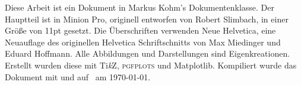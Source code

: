 {{{{    \vspace*{6pt}
        Diese Arbeit ist ein  Dokument in Markus Kohm's  Dokumentenklasse.
        Der Hauptteil ist in Minion Pro, originell entworfen von Robert Slimbach, in einer Größe von 11pt gesetzt.
        Die Überschriften verwenden Neue Helvetica, eine Neuauflage des originellen Helvetica Schriftschnitts von Max Miedinger und Eduard Hoffmann.
        Alle Abbildungen und Darstellungen sind Eigenkreationen.
        Erstellt wurden diese mit Ti\textit{k}Z, \textsc{pgfplots} und \textsf{Matplotlib}.
        Kompiliert wurde das Dokument mit  und  auf \platformname\ am \today.
    \begin{center}
        \HighlightColor{\textsc{
            \authorFirst\;\authorLast
        }}\\
        \makeatletter
        \makeatother
    \end{center}


}}\hfill}

}
